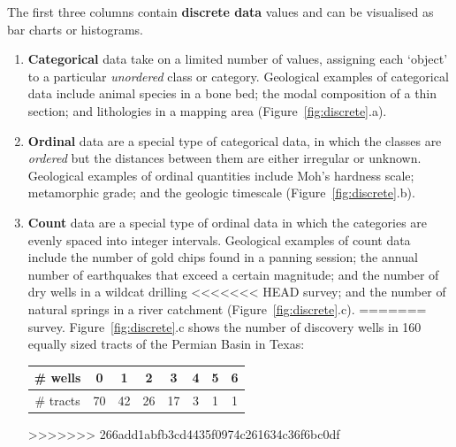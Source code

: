 The first three columns contain \textbf{discrete data} values and can
be visualised as bar charts or histograms.

\begin{enumerate}

\item\textbf{Categorical} data take on a limited number of values,
  assigning each `object' to a particular \emph{unordered} class or
  category. Geological examples of categorical data include animal
  species in a bone bed; the modal composition of a thin section; and
  lithologies in a mapping area (Figure~\ref{fig:discrete}.a).

\item\textbf{Ordinal} data are a special type of categorical data, in
  which the classes are \emph{ordered} but the distances between them
  are either irregular or unknown. Geological examples of ordinal
  quantities include Moh's hardness scale; metamorphic grade; and the
  geologic timescale (Figure~\ref{fig:discrete}.b).

\item\textbf{Count} data are a special type of ordinal data in which
  the categories are evenly spaced into integer intervals. Geological
  examples of count data include the number of gold chips found in a
  panning session; the annual number of earthquakes that exceed a
  certain magnitude; and the number of dry wells in a wildcat drilling
<<<<<<< HEAD
  survey; and the number of natural springs in a river catchment
  (Figure~\ref{fig:discrete}.c).
=======
  survey. Figure~\ref{fig:discrete}.c shows the number of discovery
  wells in 160 equally sized tracts of the Permian Basin in Texas:
  \begin{center}
    \begin{tabular}{c|ccccccc}
     \# wells & 0 & 1 & 2 & 3 & 4 & 5 & 6 \\ \hline
     \# tracts & 70 & 42 & 26 & 17 & 3 & 1 & 1
    \end{tabular}
  \end{center}
>>>>>>> 266add1abfb3cd4435f0974c261634c36f6bc0df

\end{enumerate}

